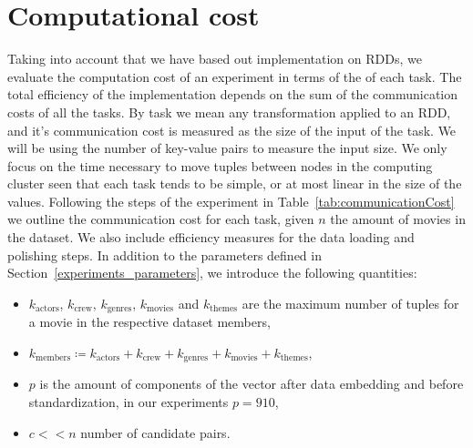 \section{Computational cost}\label{experiments_cost}
Taking into account that we have based out implementation on RDDs, we evaluate the computation cost of an experiment in terms of the  of each task. The total efficiency of the implementation depends on the sum of the communication costs of all the tasks. By task we mean any transformation applied to an RDD, and it's communication cost is measured as the size of the input of the task. We will be using the number of key-value pairs to measure the input size. We only focus on the time necessary to move tuples between nodes in the computing cluster seen that each task tends to be simple, or at most linear in the size of the values.
Following the steps of the experiment in Table~\ref{tab:communicationCost} we outline the communication cost for each task, given $n$ the amount of movies in the dataset. We also include efficiency measures for the data loading and polishing steps. In addition to the parameters defined in Section~\ref{experiments_parameters}, we introduce the following quantities:
\begin{itemize}
    \item $k_\text{actors}$, $k_\text{crew}$, $k_\text{genres}$, $k_\text{movies}$ and $k_\text{themes}$ are the maximum number of tuples for a movie in the respective dataset members,
    \item $k_\text{members} \coloneq k_\text{actors} + k_\text{crew} + k_\text{genres} + k_\text{movies} + k_\text{themes}$,
    \item $p$ is the amount of components of the vector after data embedding and before standardization, in our experiments $p=910$,
    \item $c<<n$ number of candidate pairs.
\end{itemize}

